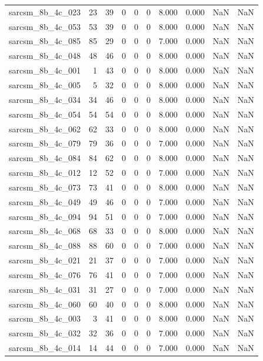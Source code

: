 \documentclass{article}
\begin{document}
\begin{longtable}{lrrrrrrrrr}
sarcsm\_8b\_4c\_023 & 23 & 39 & 0 & 0 & 0 & 8.000 & 0.000 & NaN & NaN \\
sarcsm\_8b\_4c\_053 & 53 & 39 & 0 & 0 & 0 & 8.000 & 0.000 & NaN & NaN \\
sarcsm\_8b\_4c\_085 & 85 & 29 & 0 & 0 & 0 & 7.000 & 0.000 & NaN & NaN \\
sarcsm\_8b\_4c\_048 & 48 & 46 & 0 & 0 & 0 & 8.000 & 0.000 & NaN & NaN \\
sarcsm\_8b\_4c\_001 & 1 & 43 & 0 & 0 & 0 & 8.000 & 0.000 & NaN & NaN \\
sarcsm\_8b\_4c\_005 & 5 & 32 & 0 & 0 & 0 & 8.000 & 0.000 & NaN & NaN \\
sarcsm\_8b\_4c\_034 & 34 & 46 & 0 & 0 & 0 & 8.000 & 0.000 & NaN & NaN \\
sarcsm\_8b\_4c\_054 & 54 & 54 & 0 & 0 & 0 & 8.000 & 0.000 & NaN & NaN \\
sarcsm\_8b\_4c\_062 & 62 & 33 & 0 & 0 & 0 & 8.000 & 0.000 & NaN & NaN \\
sarcsm\_8b\_4c\_079 & 79 & 36 & 0 & 0 & 0 & 7.000 & 0.000 & NaN & NaN \\
sarcsm\_8b\_4c\_084 & 84 & 62 & 0 & 0 & 0 & 8.000 & 0.000 & NaN & NaN \\
sarcsm\_8b\_4c\_012 & 12 & 52 & 0 & 0 & 0 & 7.000 & 0.000 & NaN & NaN \\
sarcsm\_8b\_4c\_073 & 73 & 41 & 0 & 0 & 0 & 8.000 & 0.000 & NaN & NaN \\
sarcsm\_8b\_4c\_049 & 49 & 46 & 0 & 0 & 0 & 7.000 & 0.000 & NaN & NaN \\
sarcsm\_8b\_4c\_094 & 94 & 51 & 0 & 0 & 0 & 7.000 & 0.000 & NaN & NaN \\
sarcsm\_8b\_4c\_068 & 68 & 33 & 0 & 0 & 0 & 8.000 & 0.000 & NaN & NaN \\
sarcsm\_8b\_4c\_088 & 88 & 60 & 0 & 0 & 0 & 7.000 & 0.000 & NaN & NaN \\
sarcsm\_8b\_4c\_021 & 21 & 37 & 0 & 0 & 0 & 7.000 & 0.000 & NaN & NaN \\
sarcsm\_8b\_4c\_076 & 76 & 41 & 0 & 0 & 0 & 7.000 & 0.000 & NaN & NaN \\
sarcsm\_8b\_4c\_031 & 31 & 27 & 0 & 0 & 0 & 7.000 & 0.000 & NaN & NaN \\
sarcsm\_8b\_4c\_060 & 60 & 40 & 0 & 0 & 0 & 8.000 & 0.000 & NaN & NaN \\
sarcsm\_8b\_4c\_003 & 3 & 41 & 0 & 0 & 0 & 8.000 & 0.000 & NaN & NaN \\
sarcsm\_8b\_4c\_032 & 32 & 36 & 0 & 0 & 0 & 7.000 & 0.000 & NaN & NaN \\
sarcsm\_8b\_4c\_014 & 14 & 44 & 0 & 0 & 0 & 7.000 & 0.000 & NaN & NaN \\

\end{longtable}
\end{document}
